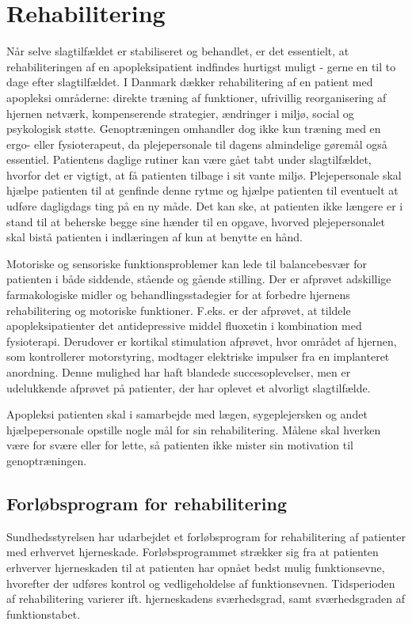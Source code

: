 \section{Rehabilitering}
Når selve slagtilfældet er stabiliseret og behandlet, er det essentielt, at rehabiliteringen af en apopleksipatient indfindes hurtigst muligt - gerne en til to dage efter slagtilfældet. I Danmark dækker rehabilitering af en patient med apopleksi områderne: direkte træning af funktioner, ufrivillig reorganisering af hjernen netværk, kompenserende strategier, ændringer i miljø, social og psykologisk støtte. Genoptræningen omhandler dog ikke kun træning med en ergo- eller fysioterapeut, da plejepersonale til dagens almindelige gøremål også essentiel. Patientens daglige rutiner kan være gået tabt under slagtilfældet, hvorfor det er vigtigt, at få patienten tilbage i sit vante miljø. Plejepersonale skal hjælpe patienten til at genfinde denne rytme og hjælpe patienten til eventuelt at udføre dagligdags ting på en ny måde. Det kan ske, at patienten ikke længere er i stand til at beherske begge sine hænder til en opgave, hvorved plejepersonalet skal bistå patienten i indlæringen af kun at benytte en hånd.

Motoriske og sensoriske funktionsproblemer kan lede til balancebesvær for patienten i både siddende, stående og gående stilling. Der er afprøvet adskillige farmakologiske midler og behandlingsstadegier for at forbedre hjernens rehabilitering og motoriske funktioner. F.eks. er der afprøvet, at tildele apopleksipatienter det antidepressive middel fluoxetin i kombination med fysioterapi. Derudover er kortikal stimulation afprøvet, hvor området af hjernen, som kontrollerer motorstyring, modtager elektriske impulser fra en implanteret anordning. Denne mulighed har haft blandede succesoplevelser, men er udelukkende afprøvet på patienter, der har oplevet et alvorligt slagtilfælde. \cite{Academic2015}
  
Apopleksi patienten skal i samarbejde med lægen, sygeplejersken og andet hjælpepersonale opstille nogle mål for sin rehabilitering. Målene skal hverken være for svære eller for lette, så patienten ikke mister sin motivation til genoptræningen. \cite{Kruuse2015}

\subsection{Forløbsprogram for rehabilitering} 
Sundhedsstyrelsen har udarbejdet et forløbsprogram for rehabilitering af patienter med erhvervet hjerneskade. Forløbsprogrammet strækker sig fra at patienten erhverver hjerneskaden til at patienten har opnået bedst mulig funktionsevne, hvorefter der udføres kontrol og vedligeholdelse af funktionsevnen. Tidsperioden af rehabilitering varierer ift. hjerneskadens sværhedsgrad, samt sværhedsgraden af funktionstabet. %
\cite{Sundhedsstyrelsen2011a}


